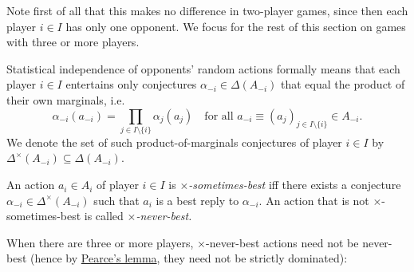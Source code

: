Note first of all that this makes no difference in two-player games, since then each player $i \in I$ has only one opponent. We focus for the rest of this section on games with three or more players.

Statistical independence of opponents' random actions formally means that each player $i \in I$ entertains only conjectures $\alpha_{-i} \in \Delta(A_{-i})$ that equal the product of their own marginals, i.e.
%
\begin{equation*}
	\alpha_{-i}(a_{-i})
	= \prod_{j \in I \setminus \{i\}} \alpha_j(a_j)
	\quad \text{for all $a_{-i} \equiv (a_j)_{j \in I \setminus \{i\}} \in A_{-i}$.}
\end{equation*}
%
We denote the set of such product-of-marginals conjectures of player $i \in I$ by $\Delta^\times(A_{-i}) \subseteq \Delta(A_{-i})$.

\begin{definition}
	\label{definition:sbr_indep}
	An action $a_i \in A_i$ of player $i \in I$ is \emph{$\times$-sometimes-best} iff there exists a conjecture $\alpha_{-i} \in \Delta^\times(A_{-i})$ such that $a_i$ is a best reply to $\alpha_{-i}$. An action that is not $\times$-sometimes-best is called \emph{$\times$-never-best.}
\end{definition}

When there are three or more players, $\times$-never-best actions need not be never-best (hence by \hyperref[lemma:pearce]{Pearce's lemma}, they need not be strictly dominated):

